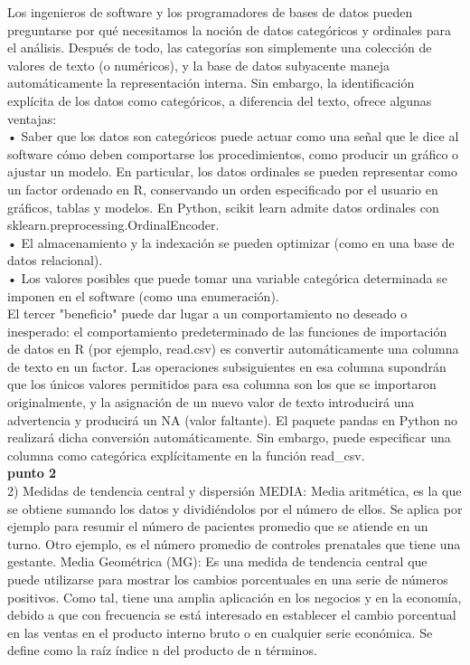 \documentclass[ebook,12pt,oneside,openany]{memoir}
\begin{document}
Los ingenieros de software y los programadores de bases de datos pueden preguntarse por qué necesitamos la noción de datos categóricos y ordinales para el análisis. Después de todo, las categorías son simplemente una colección de valores de texto (o numéricos), y la base de datos subyacente maneja automáticamente la representación interna. Sin embargo, la identificación explícita de los datos como categóricos, a diferencia del texto, ofrece algunas ventajas:\\
• Saber que los datos son categóricos puede actuar como una señal que le dice al software cómo
deben comportarse los procedimientos, como producir un gráfico o ajustar un modelo. En particular, los datos ordinales se pueden representar como un factor ordenado en R, conservando un orden especificado por el usuario en gráficos, tablas y modelos. En Python, scikit learn admite datos ordinales con sklearn.preprocessing.OrdinalEncoder.\\
• El almacenamiento y la indexación se pueden optimizar (como en una base de datos relacional).\\
• Los valores posibles que puede tomar una variable categórica determinada se imponen en el software (como una enumeración).\\
 El tercer "beneficio" puede dar lugar a un comportamiento no deseado o inesperado: el comportamiento predeterminado de las funciones de importación de datos en R (por ejemplo, read.csv) es convertir automáticamente una columna de texto en un factor. Las operaciones subsiguientes en esa columna supondrán que los únicos valores permitidos para esa columna son los que se importaron originalmente, y la asignación de un nuevo valor de texto introducirá una advertencia y producirá un NA (valor faltante). El paquete pandas en Python no realizará dicha conversión automáticamente. Sin embargo, puede especificar una columna como categórica explícitamente en la función {read_csv}.\\
\textbf{punto 2}\\
2) Medidas de tendencia central y dispersión
MEDIA: Media aritmética, es la que se obtiene sumando los datos y dividiéndolos por el número de
ellos. Se aplica por ejemplo para resumir el número de pacientes promedio que se atiende en un
turno. Otro ejemplo, es el número promedio de controles prenatales que tiene una gestante.
Media Geométrica (MG): Es una medida de tendencia central que puede utilizarse para mostrar los
cambios porcentuales en una serie de números positivos. Como tal, tiene una amplia aplicación en
los negocios y en la economía, debido a que con frecuencia se está interesado en establecer el
cambio porcentual en las ventas en el producto interno bruto o en cualquier serie económica. Se
define como la raíz índice n del producto de n términos.
\end{document}
